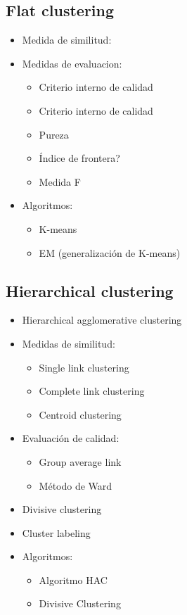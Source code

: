\documentclass{llncs}
\begin{document}
\subsection{Flat clustering}

\begin{itemize}
\item Medida de similitud:

\item Medidas de evaluacion:
\begin{itemize}
	\item Criterio interno de calidad
	
	\item Criterio interno de calidad
	
	\item Pureza
	
	\item \'Indice de frontera?
	
	\item Medida F
\end{itemize}

\item Algoritmos:
\begin{itemize}
	\item K-means
	\item EM (generalizaci\'on de K-means)
\end{itemize}
\end{itemize}


\subsection{Hierarchical clustering}

\begin{itemize}
\item Hierarchical agglomerative clustering

\item Medidas de similitud:
\begin{itemize}
	\item Single link clustering
	\item Complete link clustering
	\item Centroid clustering
\end{itemize}

\item Evaluaci\'on de calidad:
\begin{itemize}
\item Group average link
\item M\'etodo de Ward
\end{itemize}

\item Divisive clustering

\item Cluster labeling

\item Algoritmos:
\begin{itemize}
	\item Algoritmo HAC
	\item Divisive Clustering
\end{itemize}
\end{itemize}
\end{document}
